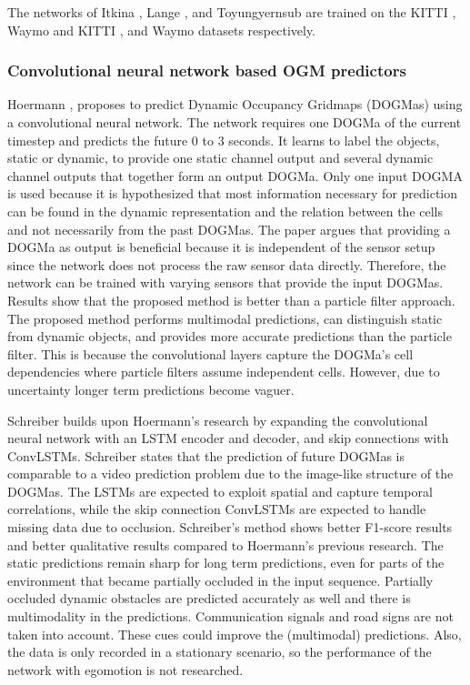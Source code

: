 The networks of Itkina \cite{itkina2019dynamic}, Lange \cite{lange2020attention}, and Toyungyernsub \cite{toyungyernsub2020double} are trained on the KITTI \cite{geiger2013vision}, Waymo \cite{sun2020scalability} and KITTI \cite{geiger2013vision}, and Waymo \cite{sun2020scalability} datasets respectively.  

\subsubsection{Convolutional neural network based OGM predictors}
Hoermann \cite{hoermann2018dynamic}, proposes to predict Dynamic Occupancy Gridmaps (DOGMas) using a convolutional neural network. The network requires one DOGMa of the current timestep and predicts the future $0$ to $3$ seconds. It learns to label the objects, static or dynamic, to provide one static channel output and several dynamic channel outputs that together form an output DOGMa. Only one input DOGMA is used because it is hypothesized that most information necessary for prediction can be found in the dynamic representation and the relation between the cells and not necessarily from the past DOGMas. The paper argues that providing a DOGMa as output is beneficial because it is independent of the sensor setup since the network does not process the raw sensor data directly. Therefore, the network can be trained with varying sensors that provide the input DOGMas. Results show that the proposed method is better than a particle filter approach. The proposed method performs multimodal predictions, can distinguish static from dynamic objects, and provides more accurate predictions than the particle filter. This is because the convolutional layers capture the DOGMa's cell dependencies where particle filters assume independent cells. However, due to uncertainty longer term predictions become vaguer. 

Schreiber \cite{schreiber2019long} builds upon Hoermann's \cite{hoermann2018dynamic} research by expanding the convolutional neural network with an LSTM encoder and decoder, and skip connections with ConvLSTMs. Schreiber \cite{schreiber2019long} states that the prediction of future DOGMas is comparable to a video prediction problem due to the image-like structure of the DOGMas. The LSTMs are expected to exploit spatial and capture temporal correlations, while the skip connection ConvLSTMs are expected to handle missing data due to occlusion. Schreiber's \cite{schreiber2019long} method shows better F1-score results and better qualitative results compared to Hoermann's \cite{hoermann2018dynamic} previous research. The static predictions remain sharp for long term predictions, even for parts of the environment that became partially occluded in the input sequence. Partially occluded dynamic obstacles are predicted accurately as well and there is multimodality in the predictions. Communication signals and road signs are not taken into account. These cues could improve the (multimodal) predictions. Also, the data is only recorded in a stationary scenario, so the performance of the network with egomotion is not researched.   

